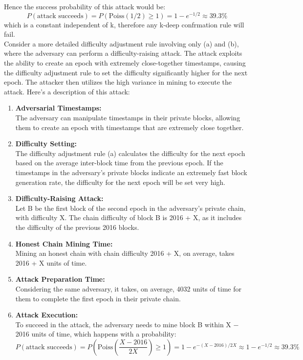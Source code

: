 Hence the success probability of this attack would be:\\
\begin{equation*}
	P(\text{attack succeeds}) = P(\text{Poiss}(1/2) \geq 1) = 1 - e^{-1/2} \approx 39.3\%
\end{equation*}
which is a constant independent of k, therefore any k-deep confrmation rule will fail.\\
Consider a more detailed difficulty adjustment rule involving only (a) and (b), where the adversary can perform a difficulty-raising attack. The attack exploits the ability to create an epoch with extremely close-together timestamps, causing the difficulty adjustment rule to set the difficulty significantly higher for the next epoch. The attacker then utilizes the high variance in mining to execute the attack. Here's a description of this attack:
\begin{enumerate}
	\item \textbf{Adversarial Timestamps:} \\The adversary can manipulate timestamps in their private blocks, allowing them to create an epoch with timestamps that are extremely close together.
	\item \textbf{Difficulty Setting:}\\The difficulty adjustment rule (a) calculates the difficulty for the next epoch based on the average inter-block time from the previous epoch. If the timestamps in the adversary's private blocks indicate an extremely fast block generation rate, the difficulty for the next epoch will be set very high.
	\item \textbf{Difficulty-Raising Attack:}\\Let B be the first block of the second epoch in the adversary's private chain, with difficulty X. The chain difficulty of block B is 2016 + X, as it includes the difficulty of the previous 2016 blocks.
	\item \textbf{Honest Chain Mining Time:}\\Mining an honest chain with chain difficulty 2016 + X, on average, takes 2016 + X units of time.
	\item \textbf{Attack Preparation Time:}\\Considering the same adversary, it takes, on average, 4032 units of time for them to complete the first epoch in their private chain.
	\item \textbf{Attack Execution:}\\To succeed in the attack, the adversary needs to mine block B within X − 2016 units of time, which happens with a probability:\begin{equation*}
		P(\text{attack succeeds}) = P(\text{Poiss}\left(\frac{X-2016}{2X}\right) \geq 1) = 1 - e^{-(X-2016)/2X} \approx 1 - e^{-1/2} \approx 39.3\%
	\end{equation*}
	
\end{enumerate}
